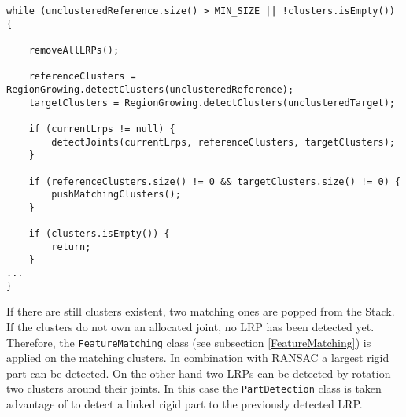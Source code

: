 \begin{lstlisting}
while (unclusteredReference.size() > MIN_SIZE || !clusters.isEmpty()) {

	removeAllLRPs();

	referenceClusters = RegionGrowing.detectClusters(unclusteredReference);
	targetClusters = RegionGrowing.detectClusters(unclusteredTarget);

	if (currentLrps != null) {
		detectJoints(currentLrps, referenceClusters, targetClusters);
	}

	if (referenceClusters.size() != 0 && targetClusters.size() != 0) {
		pushMatchingClusters();
	}

	if (clusters.isEmpty()) {
		return;
	}
...
}
\end{lstlisting}

If there are still clusters existent, two matching ones are popped from the Stack. If the clusters do not own an allocated joint, no LRP has been detected yet. Therefore, the \texttt{FeatureMatching} class (see subsection \ref{FeatureMatching}) is applied on the matching clusters. In combination with RANSAC a largest rigid part can be detected. On the other hand two LRPs can be detected by rotation two clusters around their joints. In this case the \texttt{PartDetection} class is taken advantage of to detect a linked rigid part to the previously detected LRP.

